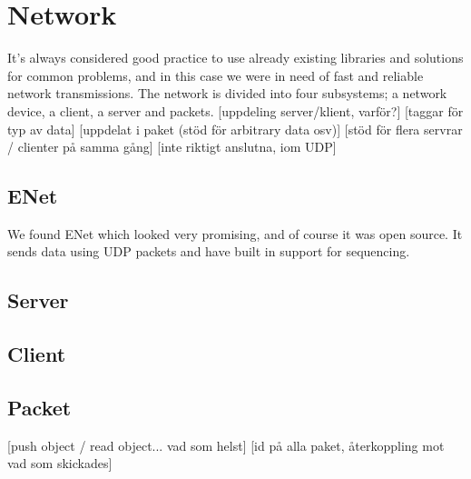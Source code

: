 \section{Network}
It's always considered good practice to use already existing libraries and solutions for common problems, and in this case we were in need of fast and reliable network transmissions.
The network is divided into four subsystems; a network device, a client, a server and packets.
[uppdeling server/klient, varför?]
[taggar för typ av data]
[uppdelat i paket (stöd för arbitrary data osv)]
[stöd för flera servrar / clienter på samma gång]
[inte riktigt anslutna, iom UDP]
\subsection{ENet}
We found ENet which looked very promising, and of course it was open source. It sends data using UDP packets and have built in support for sequencing.
\subsection{Server}
\subsection{Client}
\subsection{Packet}
[push object / read object... vad som helst]
[id på alla paket, återkoppling mot vad som skickades]


